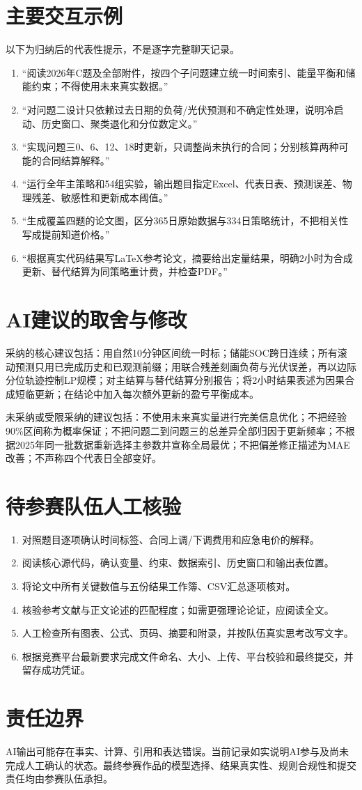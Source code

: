 \documentclass[UTF8,11pt,a4paper]{ctexart}
\begin{document}
\section{主要交互示例}

以下为归纳后的代表性提示，不是逐字完整聊天记录。

\begin{enumerate}
  \item “阅读2026年C题及全部附件，按四个子问题建立统一时间索引、能量平衡和储能约束；不得使用未来真实数据。”
  \item “对问题二设计只依赖过去日期的负荷/光伏预测和不确定性处理，说明冷启动、历史窗口、聚类退化和分位数定义。”
  \item “实现问题三0、6、12、18时更新，只调整尚未执行的合同；分别核算两种可能的合同结算解释。”
  \item “运行全年主策略和54组实验，输出题目指定Excel、代表日表、预测误差、物理残差、敏感性和更新成本阈值。”
  \item “生成覆盖四题的论文图，区分365日原始数据与334日策略统计，不把相关性写成提前知道价格。”
  \item “根据真实代码结果写LaTeX参考论文，摘要给出定量结果，明确2小时为合成更新、替代结算为同策略重计费，并检查PDF。”
\end{enumerate}

\section{AI建议的取舍与修改}

采纳的核心建议包括：用自然10分钟区间统一时标；储能SOC跨日连续；所有滚动预测只用已完成历史和已观测前缀；用联合残差刻画负荷与光伏误差，再以边际分位轨迹控制LP规模；对主结算与替代结算分别报告；将2小时结果表述为因果合成短临更新；在结论中加入每次额外更新的盈亏平衡成本。

未采纳或受限采纳的建议包括：不使用未来真实量进行完美信息优化；不把经验90\%区间称为概率保证；不把问题二到问题三的总差异全部归因于更新频率；不根据2025年同一批数据重新选择主参数并宣称全局最优；不把偏差修正描述为MAE改善；不声称四个代表日全部变好。

\section{待参赛队伍人工核验}

\begin{enumerate}
  \item 对照题目逐项确认时间标签、合同上调/下调费用和应急电价的解释。
  \item 阅读核心源代码，确认变量、约束、数据索引、历史窗口和输出表位置。
  \item 将论文中所有关键数值与五份结果工作簿、CSV汇总逐项核对。
  \item 核验参考文献与正文论述的匹配程度；如需更强理论论证，应阅读全文。
  \item 人工检查所有图表、公式、页码、摘要和附录，并按队伍真实思考改写文字。
  \item 根据竞赛平台最新要求完成文件命名、大小、上传、平台校验和最终提交，并留存成功凭证。
\end{enumerate}

\section{责任边界}

AI输出可能存在事实、计算、引用和表达错误。当前记录如实说明AI参与及尚未完成人工确认的状态。最终参赛作品的模型选择、结果真实性、规则合规性和提交责任均由参赛队伍承担。
\end{document}
